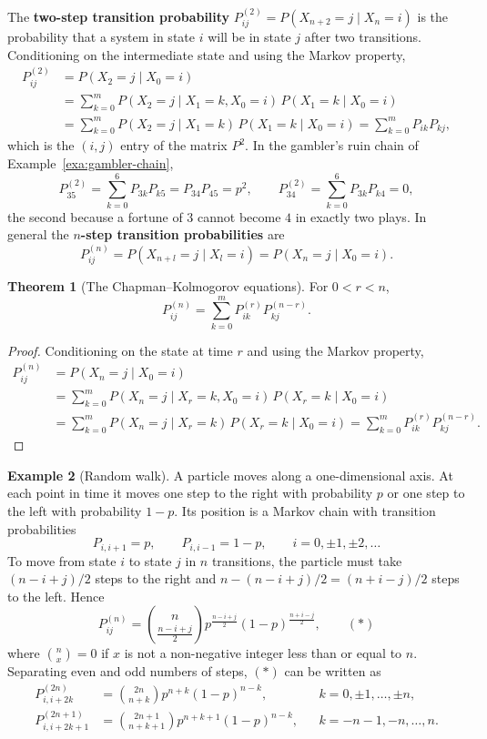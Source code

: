\documentclass[11pt,a4paper]{article}
\theoremstyle{definition}
\newtheorem{thm}{Theorem}[subsection]
\newtheorem{exa}[thm]{Example}
\begin{document}
The \textbf{two-step transition probability} $P^{(2)}_{ij} = P(X_{n+2} = j \mid X_n = i)$ is the probability that a system in state $i$ will be in state $j$ after two
transitions. Conditioning on the intermediate state and using the Markov property,
\begin{align*}
P^{(2)}_{ij} &= P(X_2 = j \mid X_0 = i) \\
&= \sum_{k=0}^mP(X_2 = j \mid X_1 = k, X_0 = i)\,P(X_1 = k \mid X_0 = i) \\
&= \sum_{k=0}^mP(X_2 = j \mid X_1 = k)\,P(X_1 = k \mid X_0 = i) = \sum_{k=0}^mP_{ik}P_{kj} ,
\end{align*}
which is the $(i, j)$ entry of the matrix $P^2$. In the gambler's ruin chain of Example~\ref{exa:gambler-chain},
\[
P^{(2)}_{35} = \sum_{k=0}^6P_{3k}P_{k5} = P_{34}P_{45} = p^2 , \qquad P^{(2)}_{34} = \sum_{k=0}^6P_{3k}P_{k4} = 0 ,
\]
the second because a fortune of $3$ cannot become $4$ in exactly two plays. In general the \textbf{$n$-step transition probabilities} are
\[
P^{(n)}_{ij} = P(X_{n+l} = j \mid X_l = i) = P(X_n = j \mid X_0 = i) .
\]

\begin{thm}[The Chapman--Kolmogorov equations]
For $0 < r < n$,
\[
P^{(n)}_{ij} = \sum_{k=0}^mP^{(r)}_{ik}P^{(n-r)}_{kj} .
\]
\end{thm}

\begin{proof}
Conditioning on the state at time $r$ and using the Markov property,
\begin{align*}
P^{(n)}_{ij} &= P(X_n = j \mid X_0 = i) \\
&= \sum_{k=0}^mP(X_n = j \mid X_r = k, X_0 = i)\,P(X_r = k \mid X_0 = i) \\
&= \sum_{k=0}^mP(X_n = j \mid X_r = k)\,P(X_r = k \mid X_0 = i) = \sum_{k=0}^mP^{(r)}_{ik}P^{(n-r)}_{kj} .
\end{align*}
\end{proof}

\begin{exa}[Random walk]
A particle moves along a one-dimensional axis. At each point in time it moves one step to the right with probability $p$ or one step to the left
with probability $1 - p$. Its position is a Markov chain with transition probabilities
\[
P_{i,i+1} = p , \qquad P_{i,i-1} = 1 - p , \qquad i = 0, \pm1, \pm2, \dots
\]
To move from state $i$ to state $j$ in $n$ transitions, the particle must take $(n - i + j)/2$ steps to the right and $n - (n - i + j)/2 = (n + i - j)/2$ steps to the
left. Hence
\[
P^{(n)}_{ij} = \binom{n}{\frac{n-i+j}{2}}p^{\frac{n-i+j}{2}}(1 - p)^{\frac{n+i-j}{2}} , \qquad (*)
\]
where $\binom nx = 0$ if $x$ is not a non-negative integer less than or equal to $n$. Separating even and odd numbers of steps, $(*)$ can be written as
\begin{align*}
P^{(2n)}_{i,i+2k} &= \binom{2n}{n+k}p^{n+k}(1 - p)^{n-k} , && k = 0, \pm1, \dots, \pm n , \\
P^{(2n+1)}_{i,i+2k+1} &= \binom{2n+1}{n+k+1}p^{n+k+1}(1 - p)^{n-k} , && k = -n - 1, -n, \dots, n .
\end{align*}
\end{exa}
\end{document}
